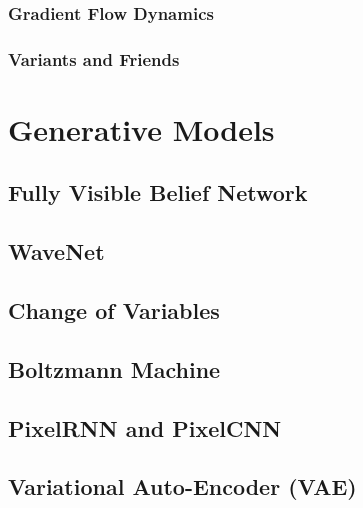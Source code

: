 		\subsection{Gradient Flow Dynamics} %

		\subsection{Variants and Friends} %

\chapter{Generative Models} %

	\section{Fully Visible Belief Network} %

	\section{WaveNet} %

	\section{Change of Variables} %

	\section{Boltzmann Machine} %

	\section{PixelRNN and PixelCNN} %

	\section{Variational Auto-Encoder (VAE)} %

